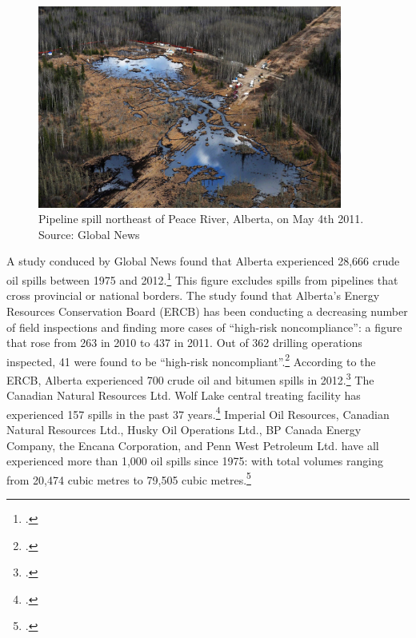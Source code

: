 \documentclass[10pt]{article}
\begin{document}
\begin{figure}[h]
\includegraphics[width=100mm]{s3-pipeline-spill.png}
\centering
\caption{Pipeline spill northeast of Peace River, Alberta, on May 4th 2011. Source: Global News}
\label{fig:s3-pipeline-spill}
\end{figure}



A study conduced by Global News found that Alberta experienced 28,666 crude oil spills between 1975 and 2012.\footcite[][]{Young37Years}
This figure excludes spills from pipelines that cross provincial or national borders.
The study found that Alberta's Energy Resources Conservation Board (ERCB) has been conducting a decreasing number of field inspections and finding more cases of ``high-risk noncompliance'': a figure that rose from 263 in 2010 to 437 in 2011.
Out of 362 drilling operations inspected, 41 were found to be ``high-risk noncompliant''.\footcite[][]{YoungPapernyRegulators}
According to the ERCB, Alberta experienced 700 crude oil and bitumen spills in 2012.\footcite[][]{YoungPapernyAnatomy}
The Canadian Natural Resources Ltd. Wolf Lake central treating facility has experienced 157 spills in the past 37 years.\footcite[][]{YoungPapernyAnatomy}
Imperial Oil Resources, Canadian Natural Resources Ltd., Husky Oil Operations Ltd., BP Canada Energy Company, the Encana Corporation, and Penn West Petroleum Ltd. have all experienced more than 1,000 oil spills since 1975: with total volumes ranging from 20,474 cubic metres to 79,505 cubic metres.\footcite[][]{YoungPapernyAnatomy}
\end{document}
